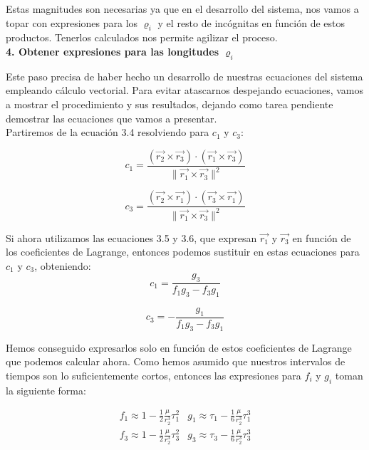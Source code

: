 \documentclass{article}
\numberwithin{equation}{section}
\begin{document}
Estas magnitudes son necesarias ya que en el desarrollo del sistema, nos vamos a topar con expresiones para los $\varrho_i$ y el resto de incógnitas en función de estos productos. Tenerlos calculados nos permite agilizar el proceso.\\

\noindent\textbf{4. Obtener expresiones para las longitudes $\varrho_i$}

Este paso precisa de haber hecho un desarrollo de nuestras ecuaciones del sistema empleando cálculo vectorial. Para evitar atascarnos despejando ecuaciones, vamos a mostrar el procedimiento y sus resultados, dejando como tarea pendiente demostrar las ecuaciones que vamos a presentar.\\

Partiremos de la ecuación 3.4 resolviendo para $c_1$ y $c_3$:

\begin{equation}
    c_1 = \frac{(\overrightarrow{r_2} \times \overrightarrow{r_3}) \cdot (\overrightarrow{r_1} \times \overrightarrow{r_3})}{\|\overrightarrow{r_1} \times \overrightarrow{r_3}\|^2}
\end{equation}

\begin{equation}
    c_3 = \frac{(\overrightarrow{r_2} \times \overrightarrow{r_1}) \cdot (\overrightarrow{r_3} \times \overrightarrow{r_1})}{\|\overrightarrow{r_1} \times \overrightarrow{r_3}\|^2}
\end{equation}

Si ahora utilizamos las ecuaciones 3.5 y 3.6, que expresan $\overrightarrow{r_1}$ y $\overrightarrow{r_3}$ en función de los coeficientes de Lagrange, entonces podemos sustituir en estas ecuaciones para $c_1$ y $c_3$, obteniendo:
\begin{equation}
c_1 = \frac{g_3}{f_{1}g_3 - f_{3}g_1}
\end{equation}

\begin{equation}
c_3 = -\frac{g_1}{f_{1}g_3 - f_{3}g_1}
\end{equation}

Hemos conseguido expresarlos solo en función de estos coeficientes de Lagrange que podemos calcular ahora. 
\newpage
Como hemos asumido que nuestros intervalos de tiempos son lo suficientemente cortos, entonces las expresiones para $f_i$ y $g_i$ toman la siguiente forma:

\begin{equation}
\begin{array}{cc}
f_1 \approx 1 - \frac{1}{2} \frac{\mu}{r_2^3} \tau_1^2 & g_1 \approx \tau_1 - \frac{1}{6} \frac{\mu}{r_2^3} \tau_1^3 \\[1.5em]
f_3 \approx 1 - \frac{1}{2} \frac{\mu}{r_2^3} \tau_3^2 & g_3 \approx \tau_3 - \frac{1}{6} \frac{\mu}{r_2^3} \tau_3^3
\end{array}
\end{equation}
\end{document}
